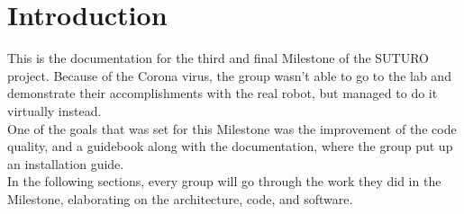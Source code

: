 \documentclass[main.tex]{subfiles}
\begin{document}
	\chapter{Introduction}

This is the documentation for the third and final Milestone of the SUTURO project. Because of the Corona virus, the group wasn't able to go to the lab and demonstrate their accomplishments with the real robot, but managed to do it virtually instead.\\
One of the goals that was set for this Milestone was the improvement of the code quality, and a guidebook along with the documentation, where the group put up an installation guide.\\
In the following sections, every group will go through the work they did in the Milestone, elaborating on the architecture, code, and software.
	
\end{document}
